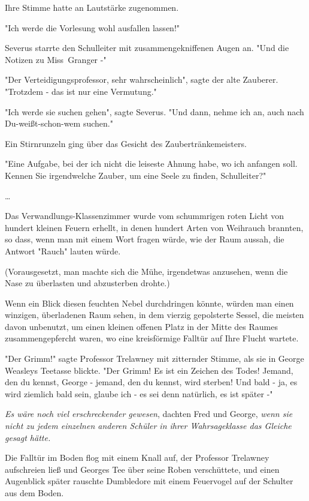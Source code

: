 {Ihre Stimme hatte an Lautstärke zugenommen.

"Ich werde die Vorlesung wohl ausfallen lassen!"

Severus starrte den Schulleiter mit zusammengekniffenen Augen an. "Und die Notizen zu Miss~Granger -"

"Der Verteidigungsprofessor, sehr wahrscheinlich", sagte der alte Zauberer. "Trotzdem - das ist nur eine Vermutung."

"Ich werde sie suchen gehen", sagte Severus. "Und dann, nehme ich an, auch nach Du-weißt-schon-wem suchen."

Ein Stirnrunzeln ging über das Gesicht des Zaubertränkemeisters.

"Eine Aufgabe, bei der ich nicht die leiseste Ahnung habe, wo ich anfangen soll. Kennen Sie irgendwelche Zauber, um eine Seele zu finden, Schulleiter?"

…

Das Verwandlungs-Klassenzimmer wurde vom schummrigen roten Licht von hundert kleinen Feuern erhellt, in denen hundert Arten von Weihrauch brannten, so dass, wenn man mit einem Wort fragen würde, wie der Raum aussah, die Antwort "Rauch" lauten würde.

(Vorausgesetzt, man machte sich die Mühe, irgendetwas anzusehen, wenn die Nase zu überlasten und abzusterben drohte.)

Wenn ein Blick diesen feuchten Nebel durchdringen könnte, würden man einen winzigen, überladenen Raum sehen, in dem vierzig gepolsterte Sessel, die meisten davon unbenutzt, um einen kleinen offenen Platz in der Mitte des Raumes zusammengepfercht waren, wo eine kreisförmige Falltür auf Ihre Flucht wartete.

"Der Grimm!" sagte Professor Trelawney mit zitternder Stimme, als sie in George Weasleys Teetasse blickte. "Der Grimm! Es ist ein Zeichen des Todes! Jemand, den du kennst, George - jemand, den du kennst, wird sterben! Und bald - ja, es wird ziemlich bald sein, glaube ich - es sei denn natürlich, es ist später -"

\emph{Es wäre noch viel erschreckender gewesen}, dachten Fred und George, \emph{wenn sie nicht zu jedem einzelnen anderen Schüler in ihrer Wahrsageklasse das Gleiche gesagt hätte.}

Die Falltür im Boden flog mit einem Knall auf, der Professor Trelawney aufschreien ließ und Georges Tee über seine Roben verschüttete, und einen Augenblick später rauschte Dumbledore mit einem Feuervogel auf der Schulter aus dem Boden.

}
